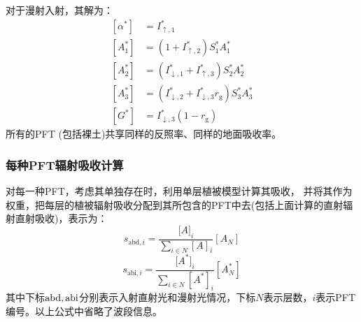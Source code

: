 对于漫射入射，其解为：
\begin{equation}
  \begin{aligned}
    \left[\alpha^{*}\right] &=I_{\uparrow, 1}^{*} \\[1ex]
    \left[A_{1}^{*}\right]& =\left(1+I_{\uparrow, 2}^{*}\right) S_{1}^{*} A_{1}^{*} \\[1ex]
    \left[A_{2}^{*}\right] &=\left(I_{\downarrow, 1}^{*}+I_{\uparrow, 3}^{*}\right) S_{2}^{*} A_{2}^{*} \\[1ex]
    \left[A_{3}^{*}\right] &=\left(I_{\downarrow, 2}^{*}+I_{\downarrow, 3}^{*} r_{\mathrm{g}}\right) S_{3}^{*} A_{3}^{*} \\[1ex]
    \left[G^{*}\right] &=I_{\downarrow, 3}^{*}\left(1-r_{\mathrm{g}}\right)
  \end{aligned}
\end{equation}
所有的PFT (包括裸土)共享同样的反照率、同样的地面吸收率。

\subsubsection{每种PFT辐射吸收计算}

对每一种PFT，考虑其单独存在时，利用单层植被模型计算其吸收，
并将其作为权重，把每层的植被辐射吸收分配到其所包含的PFT中去(包括上面计算的直射辐射直射吸收)，表示为：
%
\begin{equation}
  s_{\mathrm{abd},i} = \frac{\lbrack A\rbrack _{i}}{\sum_{i \in N}^{}\left\lbrack A \right\rbrack _{i}}\left\lbrack A_{N} \right\rbrack
\end{equation}
%
\begin{equation}
  s_{\mathrm{abi},i} = \frac{\lbrack A ^{*}\rbrack _{i}}{\sum_{i \in N}^{}\left\lbrack A ^{*}\right\rbrack _{i}}\left\lbrack A_{N}^{*} \right\rbrack
\end{equation}
%
其中下标${\rm abd}, {\rm abi}$分别表示入射直射光和漫射光情况，下标$N$表示层数，$i$表示PFT编号。以上公式中省略了波段信息。

